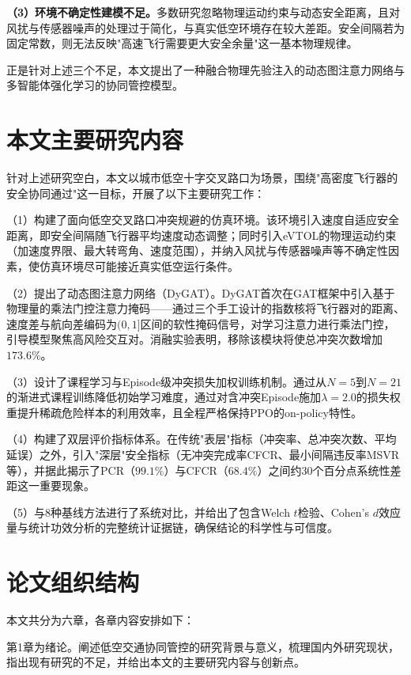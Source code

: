 \documentclass[12pt,a4paper,UTF8]{ctexbook}
\begin{document}
\textbf{（3）环境不确定性建模不足。}多数研究忽略物理运动约束与动态安全距离\cite{ref11}，且对风扰与传感器噪声的处理过于简化，与真实低空环境存在较大差距。安全间隔若为固定常数，则无法反映"高速飞行需要更大安全余量"这一基本物理规律。

正是针对上述三个不足，本文提出了一种融合物理先验注入的动态图注意力网络与多智能体强化学习的协同管控模型。

\section{本文主要研究内容}

针对上述研究空白，本文以城市低空十字交叉路口为场景，围绕"高密度飞行器的安全协同通过"这一目标，开展了以下主要研究工作：

（1）构建了面向低空交叉路口冲突规避的仿真环境。该环境引入速度自适应安全距离，即安全间隔随飞行器平均速度动态调整；同时引入eVTOL的物理运动约束（加速度界限、最大转弯角、速度范围），并纳入风扰与传感器噪声等不确定性因素，使仿真环境尽可能接近真实低空运行条件。

（2）提出了动态图注意力网络（DyGAT）。DyGAT首次在GAT框架中引入基于物理量的乘法门控注意力掩码——通过三个手工设计的指数核将飞行器对的距离、速度差与航向差编码为$(0,1]$区间的软性掩码信号，对学习注意力进行乘法门控，引导模型聚焦高风险交互对。消融实验表明，移除该模块将使总冲突次数增加$173.6\%$。

（3）设计了课程学习与Episode级冲突损失加权训练机制。通过从$N=5$到$N=21$的渐进式课程训练降低初始学习难度，通过对含冲突Episode施加$\lambda=2.0$的损失权重提升稀疏危险样本的利用效率，且全程严格保持PPO的on-policy特性。

（4）构建了双层评价指标体系。在传统"表层"指标（冲突率、总冲突次数、平均延误）之外，引入"深层"安全指标（无冲突完成率CFCR、最小间隔违反率MSVR等），并据此揭示了PCR（$99.1\%$）与CFCR（$68.4\%$）之间约30个百分点系统性差距这一重要现象。

（5）与8种基线方法进行了系统对比，并给出了包含Welch $t$检验、Cohen's $d$效应量与统计功效分析的完整统计证据链，确保结论的科学性与可信度。

\section{论文组织结构}

本文共分为六章，各章内容安排如下：

第1章为绪论。阐述低空交通协同管控的研究背景与意义，梳理国内外研究现状，指出现有研究的不足，并给出本文的主要研究内容与创新点。
\end{document}
